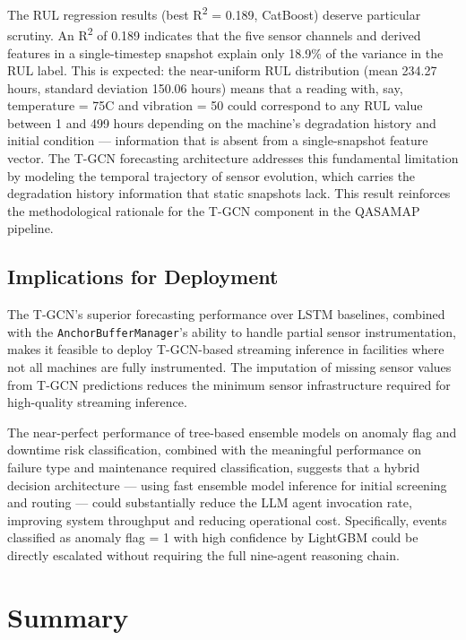 The RUL regression results (best R\textsuperscript{2} = 0.189, CatBoost) deserve particular scrutiny. An R\textsuperscript{2} of 0.189 indicates that the five sensor channels and derived features in a single-timestep snapshot explain only 18.9\% of the variance in the RUL label. This is expected: the near-uniform RUL distribution (mean 234.27 hours, standard deviation 150.06 hours) means that a reading with, say, temperature = 75\textdegree C and vibration = 50 could correspond to any RUL value between 1 and 499 hours depending on the machine's degradation history and initial condition --- information that is absent from a single-snapshot feature vector. The T-GCN forecasting architecture addresses this fundamental limitation by modeling the temporal trajectory of sensor evolution, which carries the degradation history information that static snapshots lack. This result reinforces the methodological rationale for the T-GCN component in the QASAMAP pipeline.

\subsection{Implications for Deployment}
\label{sec:deployment_implications}

The T-GCN's superior forecasting performance over LSTM baselines, combined with the \texttt{AnchorBufferManager}'s ability to handle partial sensor instrumentation, makes it feasible to deploy T-GCN-based streaming inference in facilities where not all machines are fully instrumented. The imputation of missing sensor values from T-GCN predictions reduces the minimum sensor infrastructure required for high-quality streaming inference.

The near-perfect performance of tree-based ensemble models on anomaly flag and downtime risk classification, combined with the meaningful performance on failure type and maintenance required classification, suggests that a hybrid decision architecture --- using fast ensemble model inference for initial screening and routing --- could substantially reduce the LLM agent invocation rate, improving system throughput and reducing operational cost. Specifically, events classified as anomaly flag = 1 with high confidence by LightGBM could be directly escalated without requiring the full nine-agent reasoning chain.


\section{Summary}

